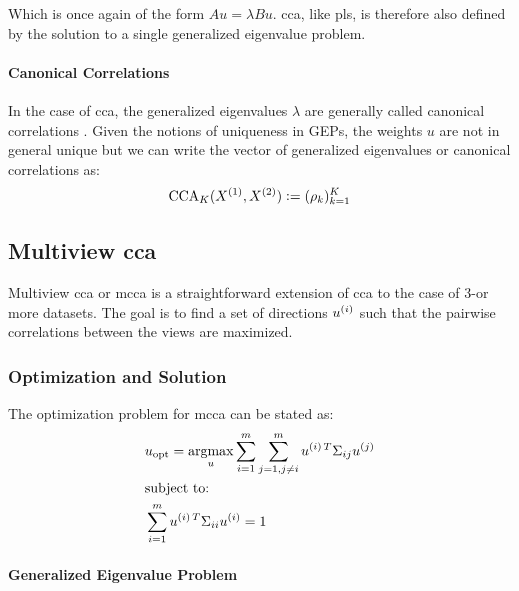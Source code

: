 Which is once again of the form $A u = \lambda B u$. \acrshort{cca}, like \acrshort{pls}, is therefore also defined by the solution to a single generalized eigenvalue problem.

\paragraph{Canonical Correlations}
In the case of \acrshort{cca}, the generalized eigenvalues $\lambda$ are generally called canonical correlations \citep{hotelling1935canonical, hotelling1992relations}.
Given the notions of uniqueness in GEPs, the weights $u$ are not in general unique but we can write the vector of generalized eigenvalues or canonical correlations as:
\begin{align}
    \label{eq:cca-vector-of-correlations-def}\small
    \operatorname{CCA}_K(X^{(1)},X^{(2)}) \vcentcolon= (\rho_k)_{k=1}^K
\end{align}

\subsection{Multiview \acrshort{cca}}

Multiview \acrshort{cca} or \acrshort{mcca} is a straightforward extension of \acrshort{cca} to the case of 3-or more datasets.
The goal is to find a set of directions \(u^{(i)}\) such that the pairwise correlations between the views are maximized.

\subsubsection{Optimization and Solution}

The optimization problem for \acrshort{mcca} can be stated as:
\begin{align}
    & u_{\text{opt}} = \underset{u}{\mathrm{argmax}} \sum_{i=1}^{m} \sum_{j=1, j \neq i}^{m} u^{(i)\,T} \Sigma_{ij} u^{(j)} \\
    & \text{subject to:} \notag                                                                                               \\
    & \sum_{i=1}^{m} u^{(i)\,T} \Sigma_{ii} u^{(i)} = 1 \notag
\end{align}

\paragraph{Generalized Eigenvalue Problem}

